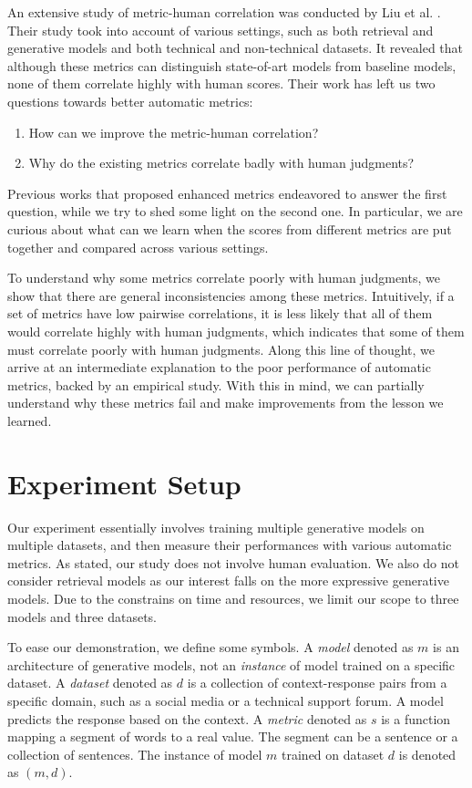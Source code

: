 \documentclass[runningheads]{llncs}
\begin{document}
    An extensive study of metric-human correlation was conducted by Liu et al. \cite{HowNot}. Their study took into account of various settings, such as both retrieval and generative models and both technical and non-technical datasets. It revealed that although these metrics can distinguish state-of-art models from baseline models, none of them correlate highly with human scores. Their work has left us two questions towards better automatic metrics:
    \begin{enumerate}
        \item How can we improve the metric-human correlation?
        \item Why do the existing metrics correlate badly with human judgments?
    \end{enumerate}
    Previous works that proposed enhanced metrics endeavored to answer the first question, while we try to shed some light on the second one. In particular, we are curious about what can we learn when the scores from different metrics are put together and compared across various settings.

    To understand why some metrics correlate poorly with human judgments, we show that there are general inconsistencies among these metrics. Intuitively, if a set of metrics have low pairwise correlations, it is less likely that all of them would correlate highly with human judgments, which indicates that some of them must correlate poorly with human judgments. Along this line of thought, we arrive at an intermediate explanation to the poor performance of automatic metrics, backed by an empirical study. With this in mind, we can partially understand why these metrics fail and make improvements from the lesson we learned.
    \section{Experiment Setup}
    Our experiment essentially involves training multiple generative models on multiple datasets, and then measure their performances with various automatic metrics. As stated, our study does not involve human evaluation. We also do not consider retrieval models as our interest falls on the more expressive generative models. Due to the constrains on time and resources, we limit our scope to three models and three datasets.

    To ease our demonstration, we define some symbols. A \emph{model} denoted as $m$ is an architecture of generative models, not an \emph{instance} of model trained on a specific dataset. A \emph{dataset} denoted as $d$ is a collection of context-response pairs from a specific domain, such as a social media or a technical support forum. A model predicts the response based on the context. A \emph{metric} denoted as $s$ is a function mapping a segment of words to a real value. The segment can be a sentence or a collection of sentences. The instance of model $m$ trained on dataset $d$ is denoted as $(m, d)$.
\end{document}

